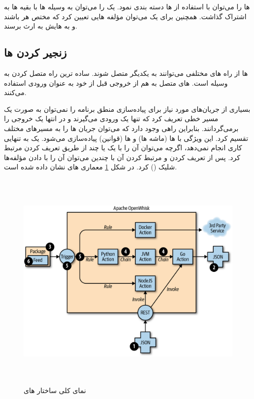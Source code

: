  ها را می‌توان با استفاده از  ها دسته بندی نمود. یک  را می‌توان به وسیله  ها با بقیه  ها به اشتراک گذاشت. همچنین برای یک  می‌توان مؤلفه هایی تعیین کرد که مختص هر  باشند و به  هایش به ارث برسند.

\subsection{زنجیر کردن  ها}

 ها از راه های مختلفی می‌توانند به یکدیگر متصل شوند. ساده ترین راه متصل کردن به وسیله  است.  های متصل به هم از خروجی  قبل از خود به عنوان ورودی استفاده می‌کنند.

بسیاری از جریان‌های مورد نیاز برای پیاده‌سازی منطق برنامه را نمی‌توان به صورت یک مسیر خطی تعریف کرد که تنها یک ورودی می‌گیرند و در انتها یک خروجی را برمی‌گردانند. بنابراین راهی وجود دارد که می‌توان جریان  ها را به مسیرهای مختلف تقسیم کرد. این ویژگی با  ها (ماشه ها) و  ها (قوانین) پیاده‌سازی می‌شود. یک  به تنهایی کاری انجام نمی‌دهد، اگرچه می‌توان آن را با یک یا چند  از طریق تعریف کردن  مرتبط کرد. پس از تعریف کردن  و مرتبط کردن آن با چندین  می‌توان آن را با دادن مؤلفه‌ها شلیک () کرد. در شکل \ref{OpenWhisk_actions_architecture} معماری  های  نشان داده شده است.

\begin{figure}[!h]
	\centering
	\includegraphics[height=11cm]{images/OpenWhisk_actions_architecture}
	\caption{نمای کلی ساختار  های }
	\label{OpenWhisk_actions_architecture}
\end{figure}

